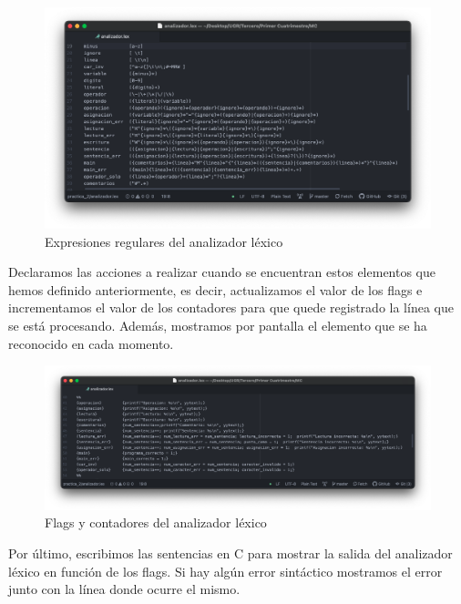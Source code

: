 \begin{figure}[H] 
	\centering
	\includegraphics[scale=0.425]{../practica_2/images/expresiones_regulares.png} 
	\caption{Expresiones regulares del analizador léxico} 
    \label{fig:expresiones_regulares}
\end{figure}

Declaramos las acciones a realizar cuando se encuentran estos elementos que hemos definido anteriormente, es decir, actualizamos el valor de los flags e incrementamos el valor de los contadores para que
quede registrado la línea que se está procesando. Además, mostramos por pantalla el elemento que se ha reconocido en cada momento.

\begin{figure}[H] 
	\centering
	\includegraphics[scale=0.35]{../practica_2/images/acciones.png} 
	\caption{Flags y contadores del analizador léxico} 
    \label{fig:acciones}
\end{figure}

Por último, escribimos las sentencias en C para mostrar la salida del analizador léxico en función de los flags. Si hay algún error sintáctico mostramos el error junto con la línea donde ocurre el mismo.

